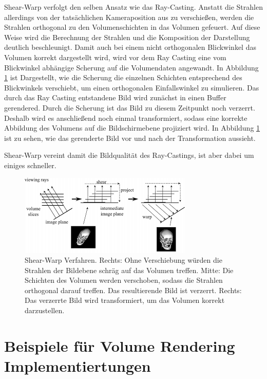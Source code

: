 Shear-Warp verfolgt den selben Ansatz wie das Ray-Casting. Anstatt die Strahlen allerdings von der tatsächlichen Kameraposition aus zu verschießen, werden die Strahlen orthogonal zu den Volumenschichten in das Volumen gefeuert. Auf diese Weise wird die Berechnung der Strahlen und die Komposition der Darstellung deutlich beschleunigt. 
Damit auch bei einem nicht orthogonalen Blickwinkel das Volumen korrekt dargestellt wird, wird vor dem Ray Casting eine vom Blickwinkel abhängige Scherung auf die Volumendaten angewandt. In Abbildung \ref{img:shearwarp} ist Dargestellt, wie die Scherung die einzelnen Schichten entsprechend des Blickwinkels verschiebt, um einen orthogonalen Einfallswinkel zu simulieren. 
Das durch das Ray Casting entstandene Bild wird zunächst in einen Buffer gerendered. Durch die Scherung ist das Bild zu diesem Zeitpunkt noch verzerrt. Deshalb wird es anschließend noch einmal transformiert, sodass eine korrekte Abbildung des Volumens auf die Bildschirmebene projiziert wird. In Abbildung \ref{img:shearwarp} ist zu sehen, wie das gerenderte Bild vor und nach der Transformation aussieht. 

Shear-Warp vereint damit die Bildqualität des Ray-Castings, ist aber dabei um einiges schneller.

\begin{figure}
	\centering
	\includegraphics[width=0.7\linewidth]{images/shearwarp.png}
	\caption{Shear-Warp Verfahren. Rechts: Ohne Verschiebung würden die Strahlen der Bildebene schräg auf das Volumen treffen. Mitte: Die Schichten des Volumen werden verschoben, sodass die Strahlen orthogonal darauf treffen. Das resultierende Bild ist verzerrt. Rechts: Das verzerrte Bild wird transformiert, um das Volumen korrekt darzustellen.}
	\label{img:shearwarp}
\end{figure}

\section{Beispiele für Volume Rendering Implementiertungen}

